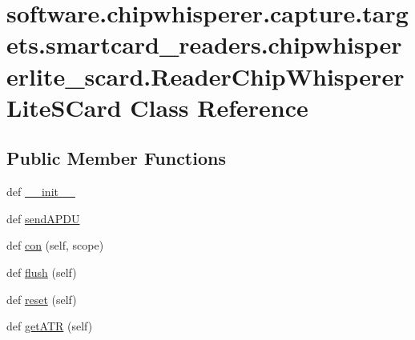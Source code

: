 \hypertarget{classsoftware_1_1chipwhisperer_1_1capture_1_1targets_1_1smartcard__readers_1_1chipwhispererlite_fcbff8031d4c94f40f5e5a51a3e4a7d0}{}\section{software.\+chipwhisperer.\+capture.\+targets.\+smartcard\+\_\+readers.\+chipwhispererlite\+\_\+scard.\+Reader\+Chip\+Whisperer\+Lite\+S\+Card Class Reference}
\label{classsoftware_1_1chipwhisperer_1_1capture_1_1targets_1_1smartcard__readers_1_1chipwhispererlite_fcbff8031d4c94f40f5e5a51a3e4a7d0}
\subsection*{Public Member Functions}
\begin{DoxyCompactItemize}
\item 
def \hyperlink{classsoftware_1_1chipwhisperer_1_1capture_1_1targets_1_1smartcard__readers_1_1chipwhispererlite_fcbff8031d4c94f40f5e5a51a3e4a7d0_a6dac3ee006c7d9bd791932481a217d24}{\+\_\+\+\_\+init\+\_\+\+\_\+}
\item 
def \hyperlink{classsoftware_1_1chipwhisperer_1_1capture_1_1targets_1_1smartcard__readers_1_1chipwhispererlite_fcbff8031d4c94f40f5e5a51a3e4a7d0_abd7af8945723ae834cd0448c05195912}{send\+A\+P\+D\+U}
\item 
def \hyperlink{classsoftware_1_1chipwhisperer_1_1capture_1_1targets_1_1smartcard__readers_1_1chipwhispererlite_fcbff8031d4c94f40f5e5a51a3e4a7d0_a39290a4b5651a411d7e66c80ed075b5c}{con} (self, scope)
\item 
def \hyperlink{classsoftware_1_1chipwhisperer_1_1capture_1_1targets_1_1smartcard__readers_1_1chipwhispererlite_fcbff8031d4c94f40f5e5a51a3e4a7d0_abb0ae233033ad6f8f2b6d60964ac0e45}{flush} (self)
\item 
def \hyperlink{classsoftware_1_1chipwhisperer_1_1capture_1_1targets_1_1smartcard__readers_1_1chipwhispererlite_fcbff8031d4c94f40f5e5a51a3e4a7d0_aa55d6c51d52166245e859caf897dd63c}{reset} (self)
\item 
def \hyperlink{classsoftware_1_1chipwhisperer_1_1capture_1_1targets_1_1smartcard__readers_1_1chipwhispererlite_fcbff8031d4c94f40f5e5a51a3e4a7d0_adcb179c0f36b507983d32ce94f750770}{get\+A\+T\+R} (self)
\end{DoxyCompactItemize}

